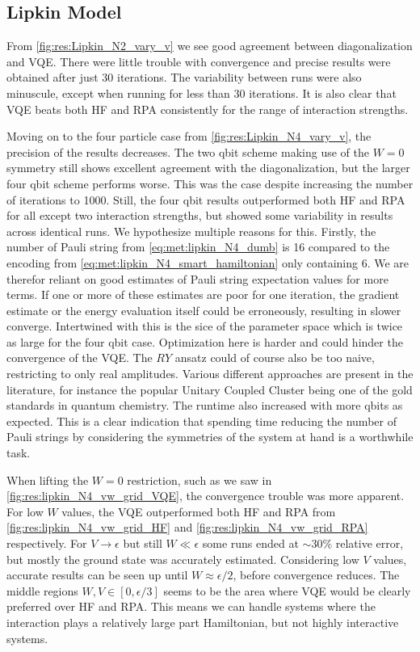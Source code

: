\subsection{Lipkin Model}
From \cref{fig:res:Lipkin_N2_vary_v} we see good agreement between diagonalization and VQE. There were little trouble with convergence and precise results were obtained after just 30 iterations. The variability between runs were also minuscule, except when running for less than 30 iterations. It is also clear that VQE beats both HF and RPA consistently for the range of interaction strengths. 

Moving on to the four particle case from \cref{fig:res:Lipkin_N4_vary_v}, the precision of the results decreases. The two qbit scheme making use of the $W=0$ symmetry still shows excellent agreement with the diagonalization, but the larger four qbit scheme performs worse. This was the case despite increasing the number of iterations to 1000. Still, the four qbit results outperformed both HF and RPA for all except two interaction strengths, but showed some variability in results across identical runs. We hypothesize multiple reasons for this. Firstly, the number of Pauli string from \cref{eq:met:lipkin_N4_dumb} is 16 compared to the encoding from \cref{eq:met:lipkin_N4_smart_hamiltonian} only containing 6. We are therefor reliant on good estimates of Pauli string expectation values for more terms. If one or more of these estimates are poor for one iteration, the gradient estimate or the energy evaluation itself could be erroneously, resulting in slower converge. Intertwined with this is the sice of the parameter space which is twice as large for the four qbit case. Optimization here is harder and could hinder the convergence of the VQE. The $RY$ ansatz could of course also be too naive, restricting to only real amplitudes. Various different approaches are present in the literature, for instance the popular Unitary Coupled Cluster \citep{peruzzoVariationalEigenvalueSolver2014} being one of the gold standards in quantum chemistry. 
The runtime also increased with more qbits as expected. This is a clear indication that spending time reducing the number of Pauli strings by considering the symmetries of the system at hand is a worthwhile task.

When lifting the $W=0$ restriction, such as we saw in \cref{fig:res:lipkin_N4_vw_grid_VQE}, the convergence trouble was more apparent. For low $W$ values, the VQE outperformed both HF and RPA from \cref{fig:res:lipkin_N4_vw_grid_HF} and \cref{fig:res:lipkin_N4_vw_grid_RPA} respectively. For $V\to\epsilon$ but still $W \ll \epsilon$ some runs ended at $\sim 30\%$ relative error, but mostly the ground state was accurately estimated. Considering low $V$ values, accurate results can be seen up until $W \approx \epsilon/2$, before convergence reduces. The middle regions $W,V \in [0,\epsilon/3]$ seems to be the area where VQE would be clearly preferred over HF and RPA. This means we can handle systems where the interaction plays a relatively large part Hamiltonian, but not highly interactive systems.

